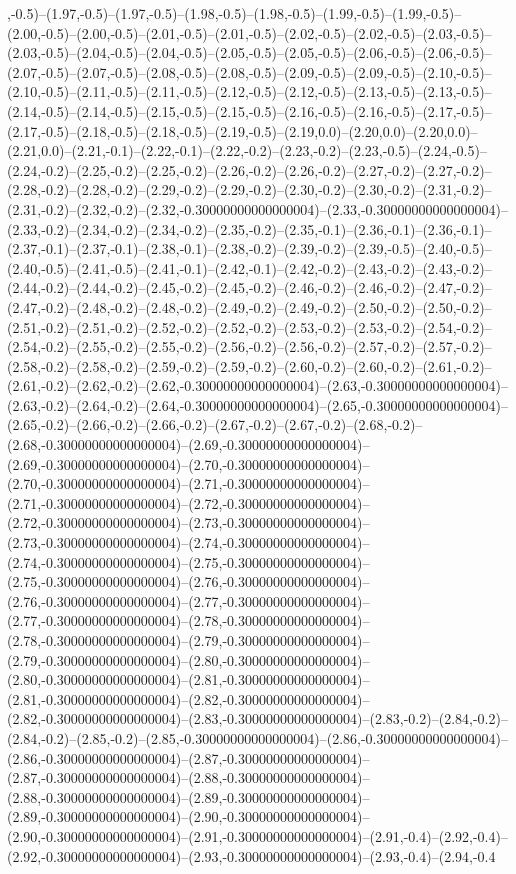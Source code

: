 ,-0.5)--(1.97,-0.5)--(1.97,-0.5)--(1.98,-0.5)--(1.98,-0.5)--(1.99,-0.5)--(1.99,-0.5)--(2.00,-0.5)--(2.00,-0.5)--(2.01,-0.5)--(2.01,-0.5)--(2.02,-0.5)--(2.02,-0.5)--(2.03,-0.5)--(2.03,-0.5)--(2.04,-0.5)--(2.04,-0.5)--(2.05,-0.5)--(2.05,-0.5)--(2.06,-0.5)--(2.06,-0.5)--(2.07,-0.5)--(2.07,-0.5)--(2.08,-0.5)--(2.08,-0.5)--(2.09,-0.5)--(2.09,-0.5)--(2.10,-0.5)--(2.10,-0.5)--(2.11,-0.5)--(2.11,-0.5)--(2.12,-0.5)--(2.12,-0.5)--(2.13,-0.5)--(2.13,-0.5)--(2.14,-0.5)--(2.14,-0.5)--(2.15,-0.5)--(2.15,-0.5)--(2.16,-0.5)--(2.16,-0.5)--(2.17,-0.5)--(2.17,-0.5)--(2.18,-0.5)--(2.18,-0.5)--(2.19,-0.5)--(2.19,0.0)--(2.20,0.0)--(2.20,0.0)--(2.21,0.0)--(2.21,-0.1)--(2.22,-0.1)--(2.22,-0.2)--(2.23,-0.2)--(2.23,-0.5)--(2.24,-0.5)--(2.24,-0.2)--(2.25,-0.2)--(2.25,-0.2)--(2.26,-0.2)--(2.26,-0.2)--(2.27,-0.2)--(2.27,-0.2)--(2.28,-0.2)--(2.28,-0.2)--(2.29,-0.2)--(2.29,-0.2)--(2.30,-0.2)--(2.30,-0.2)--(2.31,-0.2)--(2.31,-0.2)--(2.32,-0.2)--(2.32,-0.30000000000000004)--(2.33,-0.30000000000000004)--(2.33,-0.2)--(2.34,-0.2)--(2.34,-0.2)--(2.35,-0.2)--(2.35,-0.1)--(2.36,-0.1)--(2.36,-0.1)--(2.37,-0.1)--(2.37,-0.1)--(2.38,-0.1)--(2.38,-0.2)--(2.39,-0.2)--(2.39,-0.5)--(2.40,-0.5)--(2.40,-0.5)--(2.41,-0.5)--(2.41,-0.1)--(2.42,-0.1)--(2.42,-0.2)--(2.43,-0.2)--(2.43,-0.2)--(2.44,-0.2)--(2.44,-0.2)--(2.45,-0.2)--(2.45,-0.2)--(2.46,-0.2)--(2.46,-0.2)--(2.47,-0.2)--(2.47,-0.2)--(2.48,-0.2)--(2.48,-0.2)--(2.49,-0.2)--(2.49,-0.2)--(2.50,-0.2)--(2.50,-0.2)--(2.51,-0.2)--(2.51,-0.2)--(2.52,-0.2)--(2.52,-0.2)--(2.53,-0.2)--(2.53,-0.2)--(2.54,-0.2)--(2.54,-0.2)--(2.55,-0.2)--(2.55,-0.2)--(2.56,-0.2)--(2.56,-0.2)--(2.57,-0.2)--(2.57,-0.2)--(2.58,-0.2)--(2.58,-0.2)--(2.59,-0.2)--(2.59,-0.2)--(2.60,-0.2)--(2.60,-0.2)--(2.61,-0.2)--(2.61,-0.2)--(2.62,-0.2)--(2.62,-0.30000000000000004)--(2.63,-0.30000000000000004)--(2.63,-0.2)--(2.64,-0.2)--(2.64,-0.30000000000000004)--(2.65,-0.30000000000000004)--(2.65,-0.2)--(2.66,-0.2)--(2.66,-0.2)--(2.67,-0.2)--(2.67,-0.2)--(2.68,-0.2)--(2.68,-0.30000000000000004)--(2.69,-0.30000000000000004)--(2.69,-0.30000000000000004)--(2.70,-0.30000000000000004)--(2.70,-0.30000000000000004)--(2.71,-0.30000000000000004)--(2.71,-0.30000000000000004)--(2.72,-0.30000000000000004)--(2.72,-0.30000000000000004)--(2.73,-0.30000000000000004)--(2.73,-0.30000000000000004)--(2.74,-0.30000000000000004)--(2.74,-0.30000000000000004)--(2.75,-0.30000000000000004)--(2.75,-0.30000000000000004)--(2.76,-0.30000000000000004)--(2.76,-0.30000000000000004)--(2.77,-0.30000000000000004)--(2.77,-0.30000000000000004)--(2.78,-0.30000000000000004)--(2.78,-0.30000000000000004)--(2.79,-0.30000000000000004)--(2.79,-0.30000000000000004)--(2.80,-0.30000000000000004)--(2.80,-0.30000000000000004)--(2.81,-0.30000000000000004)--(2.81,-0.30000000000000004)--(2.82,-0.30000000000000004)--(2.82,-0.30000000000000004)--(2.83,-0.30000000000000004)--(2.83,-0.2)--(2.84,-0.2)--(2.84,-0.2)--(2.85,-0.2)--(2.85,-0.30000000000000004)--(2.86,-0.30000000000000004)--(2.86,-0.30000000000000004)--(2.87,-0.30000000000000004)--(2.87,-0.30000000000000004)--(2.88,-0.30000000000000004)--(2.88,-0.30000000000000004)--(2.89,-0.30000000000000004)--(2.89,-0.30000000000000004)--(2.90,-0.30000000000000004)--(2.90,-0.30000000000000004)--(2.91,-0.30000000000000004)--(2.91,-0.4)--(2.92,-0.4)--(2.92,-0.30000000000000004)--(2.93,-0.30000000000000004)--(2.93,-0.4)--(2.94,-0.4